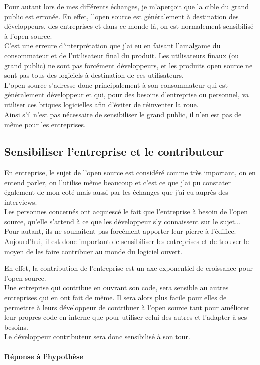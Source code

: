 	Pour autant lors de mes différents échanges, je m'aperçoit que la cible du grand public est erronée. En effet, l'open source est généralement à destination des développeurs, des entreprises et dans ce monde là, on est normalement sensibilisé à l'open source.\\

	C'est une erreure d'interprétation que j'ai eu en faisant l'amalgame du consommateur et de l'utilisateur final du produit. Les utilisateurs finaux (ou grand public) ne sont pas forcément développeurs, et les produits open source ne sont pas tous des logiciels à destination de ces utilisateurs.\\

	L'open source s'adresse donc principalement à son consommateur qui est généralement développeur et qui, pour des besoins d'entreprise ou personnel, va utiliser ces briques logicielles afin d'éviter de réinventer la roue.\\

	Ainsi s'il n'est pas nécessaire de sensibiliser le grand public, il n'en est pas de même pour les entreprises.

	\subsection{Sensibiliser l'entreprise et le contributeur}

	En entreprise, le sujet de l'open source est considéré comme très important, on en entend parler, on l'utilise même beaucoup et c'est ce que j'ai pu constater également de mon coté mais aussi par les échanges que j'ai eu auprès des interviews.\\

	Les personnes concernés ont acquiescé le fait que l'entreprise à besoin de l'open source, qu'elle s'attend à ce que les développeur s'y connaissent sur le sujet... Pour autant, ils ne souhaitent pas forcément apporter leur pierre à l'édifice.\\

	Aujourd'hui, il est donc important de sensibiliser les entreprises et de trouver le moyen de les faire contribuer au monde du logiciel ouvert.

	En effet, la contribution de l'entreprise est un axe exponentiel de croissance pour l'open source.\\

	Une entreprise qui contribue en ouvrant son code, sera sensible au autres entreprises qui en ont fait de même. Il sera alors plus facile pour elles de permettre à leurs développeur de contribuer à l'open source tant pour améliorer leur propres code en interne que pour utiliser celui des autres et l'adapter à ses besoins.\\

	Le développeur contributeur sera donc sensibilisé à son tour.

\paragraph{Réponse à l'hypothèse}


